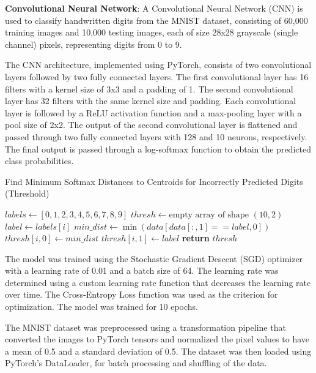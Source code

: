 
\textbf{Convolutional Neural Network}: A Convolutional Neural Network (CNN) is used to classify handwritten digits from the MNIST dataset, consisting of 60,000 training images and 10,000 testing images, each of size 28x28 grayscale (single channel) pixels, representing digits from 0 to 9.

The CNN architecture, implemented using PyTorch, consists of two convolutional layers followed by two fully connected layers. The first convolutional layer has 16 filters with a kernel size of 3x3 and a padding of 1. The second convolutional layer has 32 filters with the same kernel size and padding. Each convolutional layer is followed by a ReLU activation function and a max-pooling layer with a pool size of 2x2. The output of the second convolutional layer is flattened and passed through two fully connected layers with 128 and 10 neurons, respectively. The final output is passed through a log-softmax function to obtain the predicted class probabilities.
\begin{algorithm}
\caption{Find Minimum Softmax Distances to Centroids for Incorrectly Predicted Digits (Threshold)}
\label{alg:min_distance} 
\begin{algorithmic}[1]
    \State $labels \gets [0, 1, 2, 3, 4, 5, 6, 7, 8, 9]$
    \State $thresh \gets \text{empty array of shape } (10, 2)$
        \State $label \gets labels[i]$
        \State $min\_dist \gets \min(data[data[:, 1] == label, 0])$
        \State $thresh[i, 0] \gets min\_dist$
        \State $thresh[i, 1] \gets label$
    \EndFor
    \State \textbf{return} $thresh$
\EndProcedure
\end{algorithmic}
\end{algorithm}
The model was trained using the Stochastic Gradient Descent (SGD) optimizer with a learning rate of 0.01 and a batch size of 64. The learning rate was determined using a custom learning rate function that decreases the learning rate over time. The Cross-Entropy Loss function was used as the criterion for optimization. The model was trained for 10 epochs.

The MNIST dataset was preprocessed using a transformation pipeline that converted the images to PyTorch tensors and normalized the pixel values to have a mean of 0.5 and a standard deviation of 0.5. The dataset was then loaded using PyTorch's DataLoader, for batch processing and shuffling of the data.

